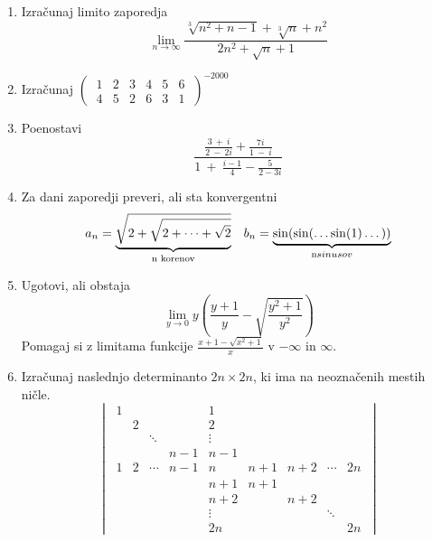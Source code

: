 \documentclass[a4paper,12pt]{article}
\begin{document}
\begin{enumerate}
    \item {
        Izračunaj limito zaporedja
        \[
            \lim_{n \rightarrow \infty} \frac{\sqrt[3]{n^2 + n - 1} + \sqrt[3]{n} + n^2}{2n^2 + \sqrt{n} + 1}
        \]
    }

    \item {
        Izračunaj $\left(\ \begin{matrix}
            1 & 2 & 3 & 4 & 5 & 6 \\
            4 & 5 & 2 & 6 & 3 & 1
        \end{matrix}\ \right)^{-2000}$
    }

    \item {
        Poenostavi
        \[
            \frac{
                \frac{3\ +\ i}{2\ -\ 2i} + \frac{7i}{1\ -\ i}
            }{
                1\ +\ \frac{i - 1}{4} - \frac{5}{2 - 3i}
            }
        \]
    }

    \item {
        Za dani zaporedji preveri, ali sta konvergentni
        \begin{align}
            a_n = \underbrace{\sqrt{2 + \sqrt{2 + \cdots + \sqrt{2}}}}_{\text{n korenov}} && b_n=\underbrace{\sin(\sin(\dots\sin(1)\dots))}_{\text n sinusov} \nonumber
        \end{align}
    }


    \item {
        Ugotovi, ali obstaja
        \[
            \lim_{y \rightarrow 0} y\left(\frac{y + 1}{y} - \sqrt{\frac{y^2 + 1}{y^2}}\right)
        \]
        Pomagaj si z limitama funkcije $\frac{x + 1 - \sqrt{x^2 + 1}}{x}$ v $-\infty$ in $\infty$.
    }

    \item {
        Izračunaj naslednjo determinanto $2n \times 2n$, ki ima na neoznačenih mestih ničle.
        \[
        \begin{vmatrix}
          \  1 & & & & 1 \\
            & 2 & & & 2 \\
            & & \ddots & & \vdots \\
            & & & n - 1 & n - 1 \\
          \  1 & 2 & \cdots & n - 1 & n & n + 1 & n + 2 & \cdots & 2n \ \\
            & & & & n + 1 & n + 1 \\
            & & & & n + 2 & & n + 2 \\
            & & & & \vdots & & & \ddots \\
            & & & &  2n & & & & 2n


\end{vmatrix}\]}
\end{enumerate}
\end{document}
